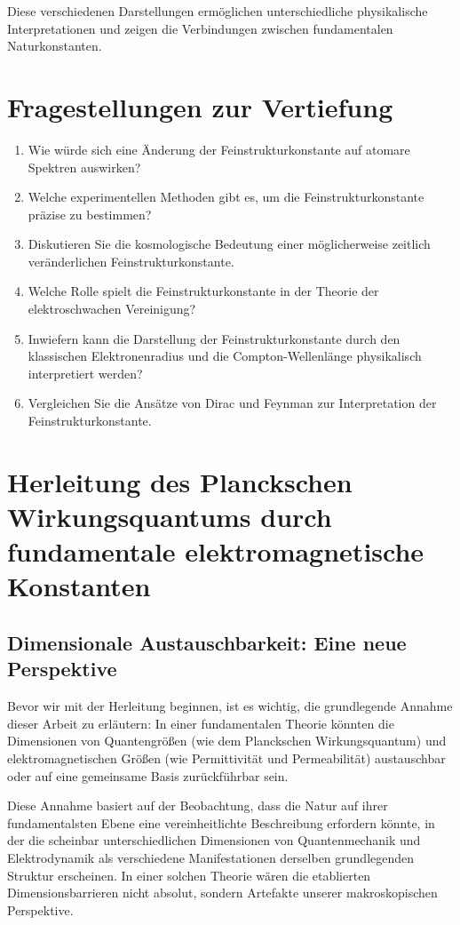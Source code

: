 \documentclass{article}
\begin{document}
	Diese verschiedenen Darstellungen ermöglichen unterschiedliche physikalische Interpretationen und zeigen die Verbindungen zwischen fundamentalen Naturkonstanten.
	
	\section{Fragestellungen zur Vertiefung}
	
	\begin{enumerate}
		\item Wie würde sich eine Änderung der Feinstrukturkonstante auf atomare Spektren auswirken?
		\item Welche experimentellen Methoden gibt es, um die Feinstrukturkonstante präzise zu bestimmen?
		\item Diskutieren Sie die kosmologische Bedeutung einer möglicherweise zeitlich veränderlichen Feinstrukturkonstante.
		\item Welche Rolle spielt die Feinstrukturkonstante in der Theorie der elektroschwachen Vereinigung?
		\item Inwiefern kann die Darstellung der Feinstrukturkonstante durch den klassischen Elektronenradius und die Compton-Wellenlänge physikalisch interpretiert werden?
		\item Vergleichen Sie die Ansätze von Dirac und Feynman zur Interpretation der Feinstrukturkonstante.
	\end{enumerate}
	
	\section{Herleitung des Planckschen Wirkungsquantums durch fundamentale elektromagnetische Konstanten}
	
	\subsection{Dimensionale Austauschbarkeit: Eine neue Perspektive}
	
	Bevor wir mit der Herleitung beginnen, ist es wichtig, die grundlegende Annahme dieser Arbeit zu erläutern: In einer fundamentalen Theorie könnten die Dimensionen von Quantengrößen (wie dem Planckschen Wirkungsquantum) und elektromagnetischen Größen (wie Permittivität und Permeabilität) austauschbar oder auf eine gemeinsame Basis zurückführbar sein.
	
	Diese Annahme basiert auf der Beobachtung, dass die Natur auf ihrer fundamentalsten Ebene eine vereinheitlichte Beschreibung erfordern könnte, in der die scheinbar unterschiedlichen Dimensionen von Quantenmechanik und Elektrodynamik als verschiedene Manifestationen derselben grundlegenden Struktur erscheinen. In einer solchen Theorie wären die etablierten Dimensionsbarrieren nicht absolut, sondern Artefakte unserer makroskopischen Perspektive.
	
\end{document}
